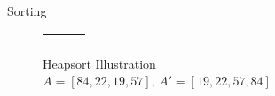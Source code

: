 \documentclass{article}
\begin{document}
\begin{section}{Sorting}
\begin{enumerate}
\begin{figure}[h!]
\begin{tabular}{C{.20\linewidth}C{.20\linewidth}C{.20\linewidth}}
     &
    
     \\
    \end{tabular}
    
    \caption{Heapsort Illustration \\ $A = [84, 22, 19, 57]$, $A' = [19, 22, 57, 84]$}
    \label{fig:heapsort}
    \end{figure}
\end{enumerate}
\end{section}
\end{document}
